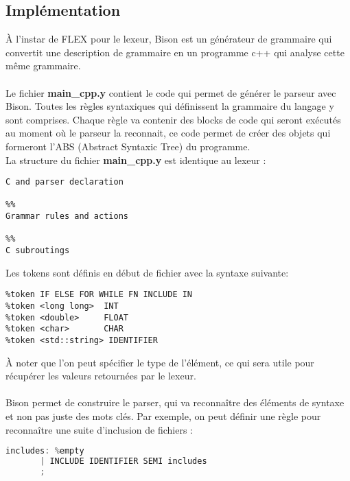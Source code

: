\documentclass[a4paper]{article}
\begin{document}
\subsection{Implémentation}
À l'instar de FLEX pour le lexeur, Bison est un générateur de grammaire qui convertit une description de grammaire en un programme c++ qui analyse cette même grammaire.\\~\\
 Le fichier \textbf{main\_cpp.y} contient le code qui permet de générer le parseur avec Bison. Toutes les règles syntaxiques qui définissent la grammaire du langage y sont comprises.
Chaque règle va contenir des blocks de code qui seront exécutés au moment où le parseur la reconnait, ce code permet de créer des objets qui formeront l'ABS (Abstract Syntaxic Tree) du programme.\\


La structure du fichier \textbf{main\_cpp.y} est identique au lexeur :

\begin{lstlisting}
C and parser declaration

%%
Grammar rules and actions

%%
C subroutings
\end{lstlisting}\leavevmode\newline

Les tokens sont définis en début de fichier avec la syntaxe suivante:

\begin{lstlisting}
%token IF ELSE FOR WHILE FN INCLUDE IN
%token <long long>  INT
%token <double>     FLOAT
%token <char>       CHAR
%token <std::string> IDENTIFIER
\end{lstlisting}\leavevmode\newline

À noter que l'on peut spécifier le type de l'élément, ce qui sera utile pour
récupérer les valeurs retournées par le lexeur.\\~\\


Bison permet de construire le parser, qui va reconnaître des éléments de syntaxe
et non pas juste des mots clés. Par exemple, on peut définir une règle pour
reconnaître une suite d'inclusion de fichiers :\\

\begin{lstlisting}[language=c++]
includes: %empty
       | INCLUDE IDENTIFIER SEMI includes
       ;
\end{lstlisting}\leavevmode\newline
\end{document}
